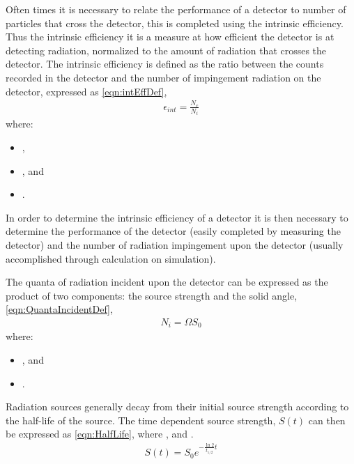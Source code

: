 
Often times it is necessary to relate the performance of a detector to number of particles that cross the detector, this is completed using the intrinsic efficiency.
Thus the intrinsic efficiency it is a measure at how efficient the detector is at detecting radiation, normalized to the amount of radiation that crosses the detector.
The intrinsic efficiency is defined as the ratio between the counts recorded in the detector and the number of impingement radiation on the detector\cite{knoll_radiation_2009}, expressed as \eqref{eqn:intEffDef},
\begin{align}
  \label{eqn:intEffDef}
  \epsilon_{int} = \frac{N_c}{N_i}
\end{align}
where:
\begin{itemize}
  \item[] ,
  \item[] , and
  \item[] .
\end{itemize}
In order to determine the intrinsic efficiency of a detector it is then necessary to determine the performance of the detector (easily completed by measuring the detector) and the number of radiation impingement upon the detector (usually accomplished through calculation on simulation).

The quanta of radiation incident upon the detector can be expressed as the product of two components: the source strength and the solid angle, \eqref{eqn:QuantaIncidentDef},
\begin{align}
  \label{eqn:QuantaIncidentDef}
  N_i = \Omega S_0
\end{align}
where:
\begin{itemize}
  \item[] , and 
  \item[] .
\end{itemize}
Radiation sources generally decay from their initial source strength according to the half-life of the source.
The time dependent source strength, $S(t)$ can then be expressed as \eqref{eqn:HalfLife}, where ,  and .
\begin{align}
  \label{eqn:HalfLife}
  S(t) = S_0 e^{-\frac{\ln{2}}{t_{1/2}} t}
\end{align}

